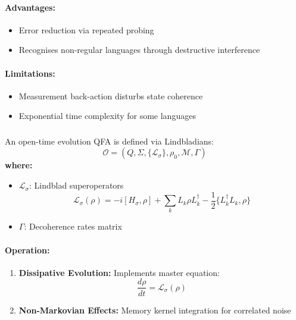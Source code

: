 \paragraph{Advantages:}
\begin{itemize}
    \item Error reduction via repeated probing
    \item Recognises non-regular languages through destructive interference
\end{itemize}

\paragraph{Limitations:}
\begin{itemize}
    \item Measurement back-action disturbs state coherence
    \item Exponential time complexity for some languages
\end{itemize}

\subsubsection{}
\label{subsec:otqfa}

\begin{definition}
An open-time evolution QFA is defined via Lindbladians:
\[
\mathcal{O} = (Q, \Sigma, \{\mathcal{L}_\sigma\}, \rho_0, \mathcal{M}, \Gamma)
\]
\textbf{where:}
\begin{itemize}
    \item $\mathcal{L}_\sigma$: Lindblad superoperators
    \[
    \mathcal{L}_\sigma(\rho) = -i[H_\sigma,\rho] + \sum_k L_k\rho L_k^\dagger - \frac{1}{2}\{L_k^\dagger L_k, \rho\}
    \]
    \item $\Gamma$: Decoherence rates matrix
\end{itemize}
\end{definition}

\paragraph{Operation:}
\begin{enumerate}
    \item \textbf{Dissipative Evolution:} Implements master equation:
    \[
    \frac{d\rho}{dt} = \mathcal{L}_\sigma(\rho)
    \]
    \item \textbf{Non-Markovian Effects:} Memory kernel integration for correlated noise
\end{enumerate}

